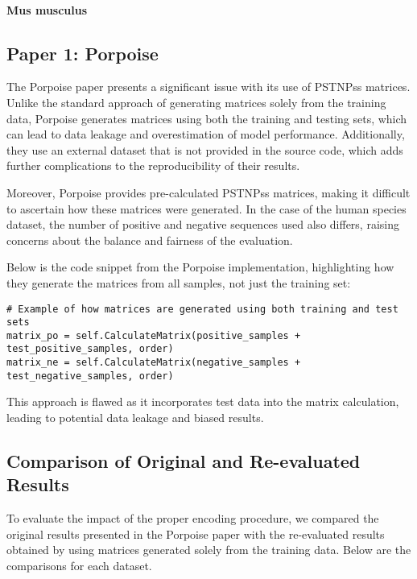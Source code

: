       \paragraph{Mus musculus}

  \subsection{Paper 1: Porpoise}

    The Porpoise paper presents a significant issue with its use of PSTNPss matrices. Unlike the standard approach of generating matrices solely from the training data, Porpoise generates matrices using both the training and testing sets, which can lead to data leakage and overestimation of model performance. Additionally, they use an external dataset that is not provided in the source code, which adds further complications to the reproducibility of their results.

    Moreover, Porpoise provides pre-calculated PSTNPss matrices, making it difficult to ascertain how these matrices were generated. In the case of the human species dataset, the number of positive and negative sequences used also differs, raising concerns about the balance and fairness of the evaluation.

    Below is the code snippet from the Porpoise implementation, highlighting how they generate the matrices from all samples, not just the training set:

    \begin{lstlisting}[caption={Porpoise: Matrix Generation Code}]
# Example of how matrices are generated using both training and test sets
matrix_po = self.CalculateMatrix(positive_samples + test_positive_samples, order)
matrix_ne = self.CalculateMatrix(negative_samples + test_negative_samples, order)
    \end{lstlisting}

    This approach is flawed as it incorporates test data into the matrix calculation, leading to potential data leakage and biased results.

  \subsection{Comparison of Original and Re-evaluated Results}

    To evaluate the impact of the proper encoding procedure, we compared the original results presented in the Porpoise paper with the re-evaluated results obtained by using matrices generated solely from the training data. Below are the comparisons for each dataset.

